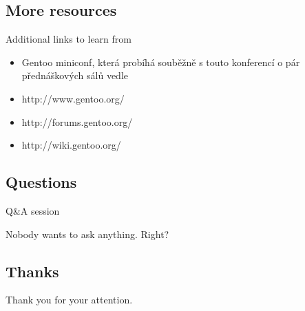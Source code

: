 \documentclass{beamer}
\begin{document}
\subsection{More resources}
\begin{frame}{Additional links to learn from}
	\begin{itemize}
		\item Gentoo miniconf, která probíhá souběžně s touto konferencí o pár přednáškových sálů vedle
		\item http://www.gentoo.org/
		\item http://forums.gentoo.org/
		\item http://wiki.gentoo.org/
	\end{itemize}
\end{frame}

\subsection{Questions}
\begin{frame}{Q\&A session}
	\begin{center}Nobody wants to ask anything. Right?\end{center}
\end{frame}

\subsection{Thanks}
\begin{frame}{}
	\begin{center}Thank you for your attention.\end{center}
\end{frame}
\end{document}
